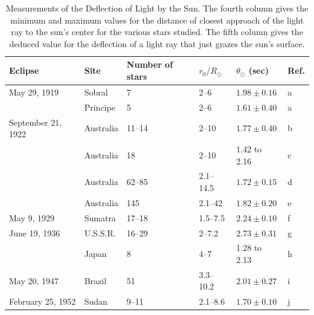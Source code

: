 \begingroup
\renewcommand{\thetable}{8.1}
\begin{table}[p]
\centering
\caption{Measurements of the Deflection of Light by the Sun. The fourth
column gives the minimum and maximum values for the distance of closest
approach of the light ray to the sun's center for the various stars studied.
The fifth column gives the deduced value for the deflection of a light ray
that just grazes the sun's surface.}
\label{tab:8.1}
\scriptsize
\begin{tabular}{@{}llllll@{}}
\toprule
Eclipse & Site & Number of stars & \(r_0/R_\odot\) &
\(\theta_\odot\) (sec) & Ref.\\
\midrule
May 29, 1919 & Sobral & 7 & 2--6 & \(1.98\pm0.16\) & a\\
 & Principe & 5 & 2--6 & \(1.61\pm0.40\) & a\\
September 21, 1922 & Australia & 11--14 & 2--10 &
  \(1.77\pm0.40\) & b\\
 & Australia & 18 & 2--10 & 1.42 to 2.16 & c\\
 & Australia & 62--85 & 2.1--14.5 & \(1.72\pm0.15\) & d\\
 & Australia & 145 & 2.1--42 & \(1.82\pm0.20\) & e\\
May 9, 1929 & Sumatra & 17--18 & 1.5--7.5 & \(2.24\pm0.10\) & f\\
June 19, 1936 & U.S.S.R. & 16--29 & 2--7.2 & \(2.73\pm0.31\) & g\\
 & Japan & 8 & 4--7 & 1.28 to 2.13 & h\\
May 20, 1947 & Brazil & 51 & 3.3--10.2 & \(2.01\pm0.27\) & i\\
February 25, 1952 & Sudan & 9--11 & 2.1--8.6 & \(1.70\pm0.10\) & j\\
\bottomrule
\end{tabular}


\end{table}
